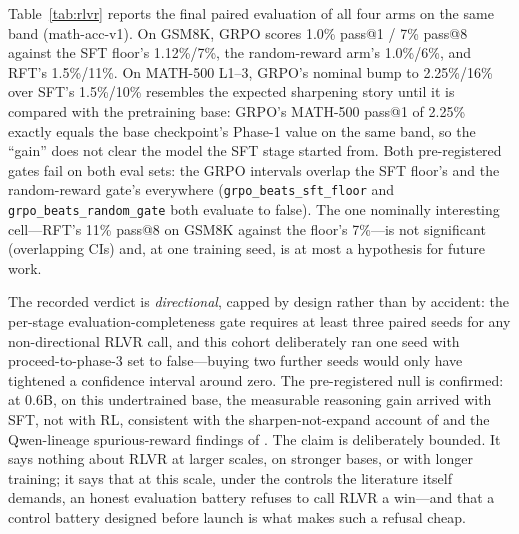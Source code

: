 Table~\ref{tab:rlvr} reports the final paired evaluation of all four arms on the same band
(math-acc-v1). On GSM8K, GRPO scores 1.0\% pass@1 / 7\% pass@8 against the SFT floor's
1.12\%/7\%, the random-reward arm's 1.0\%/6\%, and RFT's 1.5\%/11\%. On MATH-500 L1--3, GRPO's
nominal bump to 2.25\%/16\% over SFT's 1.5\%/10\% resembles the expected sharpening story
until it is compared with the pretraining base: GRPO's MATH-500 pass@1 of 2.25\% exactly
equals the base checkpoint's Phase-1 value on the same band, so the ``gain'' does not clear
the model the SFT stage started from. Both pre-registered gates fail on both eval sets: the
GRPO intervals overlap the SFT floor's and the random-reward gate's everywhere
(\texttt{grpo\_beats\_sft\_floor} and \texttt{grpo\_beats\_random\_gate} both evaluate to
false). The one nominally interesting cell---RFT's 11\% pass@8 on GSM8K against the floor's
7\%---is not significant (overlapping CIs) and, at one training seed, is at most a hypothesis
for future work.

The recorded verdict is \emph{directional}, capped by design rather than by accident: the
per-stage evaluation-completeness gate requires at least three paired seeds for any
non-directional RLVR call, and this cohort deliberately ran one seed with
proceed-to-phase-3 set to false---buying two further seeds would only have tightened a
confidence interval around zero. The pre-registered null is confirmed: at 0.6B, on this
undertrained base, the measurable reasoning gain arrived with SFT, not with RL, consistent
with the sharpen-not-expand account of \citet{yue2025does} and the Qwen-lineage
spurious-reward findings of \citet{shao2025spurious}. The claim is deliberately bounded. It
says nothing about RLVR at larger scales, on stronger bases, or with longer training; it says
that at this scale, under the controls the literature itself demands, an honest evaluation
battery refuses to call RLVR a win---and that a control battery designed before launch is
what makes such a refusal cheap.
